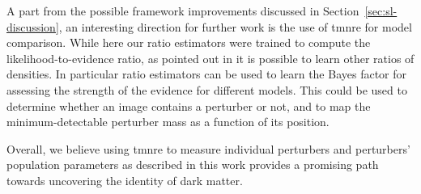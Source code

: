 \mbox{}

A part from the possible framework improvements discussed in Section~\ref{sec:sl-discussion}, an interesting direction for further work is the use of \gls*{tmnre} for model comparison. While here our ratio estimators were trained to compute the likelihood-to-evidence ratio, as pointed out in \cite{Hermans:2019ioj} it is possible to learn other ratios of densities. In particular ratio estimators can be used to learn the Bayes factor for assessing the strength of the evidence for different models. This could be used to determine whether an image contains a perturber or not, and to map the minimum-detectable perturber mass as a function of its position.

Overall, we believe using \gls*{tmnre} to measure individual perturbers and perturbers' population parameters as described in this work provides a promising path towards uncovering the identity of dark matter.

%
%
%
%
%
%



